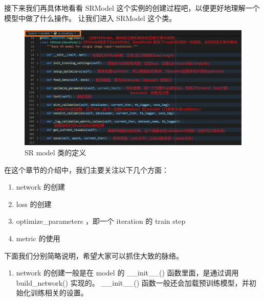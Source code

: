 \documentclass[../main.tex]{subfiles}
\begin{document}
\begin{enumerate}
          接下来我们再具体地看看 SRModel 这个实例的创建过程吧，以便更好地理解一个模型中做了什么操作。
          让我们进入 SRModel 这个类。

          \begin{figure}[H]
              \begin{center}
                  \includegraphics[width=0.7\linewidth]{figures/getting_start_13.png}
                  \caption{SR model 类的定义}
                  \label{fig:getting_start_13}
              \end{center}
              \vspace{-0.5cm}
          \end{figure}

          在这个章节的介绍中，我们主要关注以下几个方面：

          \begin{enumerate}
              \item network 的创建
              \item loss 的创建
              \item optimize\_parameters ，即一个 iteration 的 train step
              \item metric 的使用
          \end{enumerate}

          下面我们分别简略说明，希望大家可以抓住大致的脉络。

          \begin{enumerate}

              \item network 的创建一般是在 model 的 \_\_init\_\_() 函数里面，是通过调用 build\_network() 实现的。 \_\_init\_\_() 函数一般还会加载预训练模型，并初始化训练相关的设置。


\end{enumerate}
\end{enumerate}
\end{document}
